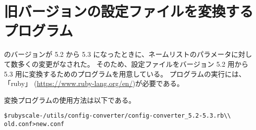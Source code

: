 \section{旧バージョンの設定ファイルを変換するプログラム}

\scalelib のバージョンが 5.2 から 5.3 になったときに、ネームリストのパラメータに対して数多くの変更がなされた。
そのため、設定ファイルをバージョン 5.2 用から 5.3 用に変換するためのプログラムを用意している。
プログラムの実行には、「ruby」 (\url{https://www.ruby-lang.org/en/})が必要である。

変換プログラムの使用方法は以下である。\\
\begin{alltt}
 \$ ruby scale-{\version}/utils/config-converter/config-converter_5.2-5.3.rb \verb|\\|
        old.conf > new.conf
\end{alltt}
